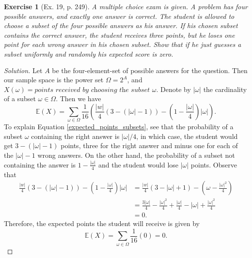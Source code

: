 \documentclass[letterpaper, 10 pt, conference]{article}
\newtheorem{ex}{Exercise}
\newcommand\E{\ensuremath{\mathbb{E}}}
\newcommand\Om{\ensuremath{\Omega}}
\newcommand{\w}{\ensuremath{\omega}}
\begin{document}
\begin{ex}[Ex. 19, p. 249]
	A multiple choice exam is given. A problem has four possible answers, and exactly one answer is correct. The student is allowed to choose a subset of the four possible answers as his answer. If his chosen subset contains the correct answer, the student receives three points, but he loses one point for each wrong answer in his chosen subset. Show that if he just guesses a subset uniformly and randomly his expected score is zero. 
\end{ex}
\begin{proof}[Solution]
Let $A$ be the four-element-set of possible answers for the question. Then our sample space is the power set $\Om = 2^A$, and $X(\w) = \textit{points received by choosing the subset } \w$. Denote by $|\w|$ the cardinality of a subset $\w \in \Om$. Then we have 
\begin{equation}\label{expected_points_subsets}
	\E(X) = \sum_{\w \in \Om} \frac{1}{16} \left( \frac{|w|}{4} \left(3 - (|\w| - 1)\right) - \left(1-\frac{|\w|}{4}\right) |\w| \right).
\end{equation}
To explain Equation \ref{expected_points_subsets}, see that the probability of a subset $\w$ containing the right answer is $|\w| / 4$, in which case, the student would get $3-(|\w| -1)$ points, three for the right answer and minus one for each of the $|\w| - 1$ wrong answers. On the other hand, the probability of a subset not containing the answer is $1-\frac{|\w|}{4}$ and the student would lose $|\w|$ points.  Observe that 
\begin{align}
 \frac{|w|}{4} \left(3 - (|\w| - 1)\right) - \left(1-\frac{|\w|}{4}\right) |\w| &=  \frac{|w|}{4}  \left(3 - |\w| + 1\right) - \left(\w - \frac{|\w|^2}{4}\right)\\
 &= \frac{3 |\w|}{4} - \frac{|\w|^2}{4} + \frac{|\w|}{4} - |\w| + \frac{|\w|^2}{4}\\
 &= 0.
\end{align}
Therefore, the expected points the student will receive is given by 
\begin{equation}
	\E(X) = \sum_{\w \in \Om} \frac{1}{16} (0) = 0.
\end{equation}
\end{proof}
\end{document}
